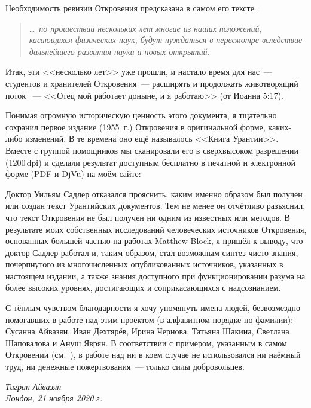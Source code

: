 Необходимость ревизии Откровения предсказана в самом его тексте :
\begin{quote}
\ldots\itshape\ по прошествии нескольких лет многие из наших положений, касающихся физических наук, будут нуждаться в пересмотре вследствие дальнейшего развития науки и новых открытий.
\end{quote}
Итак, эти <<несколько лет>> уже прошли, и настало время для нас~--- студентов и хранителей Откровения~--- расширять и
продолжать животворящий поток ~--- <<Отец мой работает доныне, и я работаю>> (от Иоанна 5:17).

Понимая огромную историческую ценность этого документа,
я тщательно сохранил первое издание (1955~г.) Откровения в оригинальной форме,  каких-либо изменений.
В те времена оно ещё называлось <<Книга Урантии>>.
Вместе с группой помощников мы сканировали его в сверхвысоком разрешении (1200\,dpi) и сделали результат доступным бесплатно
в печатной и электронной форме (PDF и DjVu) на моём сайте:

\begin{center}
\end{center}

Доктор Уильям Садлер отказался прояснить, каким именно образом был получен или создан текст Урантийских документов.
Тем не менее он отчётливо разъяснил, что текст Откровения не был получен ни одним из известных
 или  методов.
В результате моих собственных исследований человеческих источников Откровения, основанных большей частью
на работах Matthew Block, я пришёл к выводу, что доктор Садлер работал
 и, таким образом, стал возможным синтез чисто  знания,
почерпнутого из многочисленных опубликованных источников, указанных в настоящем издании,
а также знания 
доступного при функционировании разума на более высоких уровнях, достигающих и соприкасающихся с надсознанием.

С тёплым чувством благодарности я хочу упомянуть имена людей, безвозмездно помогавших в работе над этим проектом
(в алфавитном порядке по фамилии): Сусанна Айвазян, Иван Дехтярёв, Ирина Чернова, Татьяна Шакина, Светлана Шаповалова и Ануш Яврян.
В соответствии с примером, указанным в самом Откровении (см.~), в работе над
 ни в коем случае не использовался ни наёмный труд, ни денежные пожертвования~--- только
силы добровольцев.


\begin{flushleft}
\itshape
Тигран Айвазян\\
Лондон, 21 ноября 2020 г.\\
\end{flushleft}
